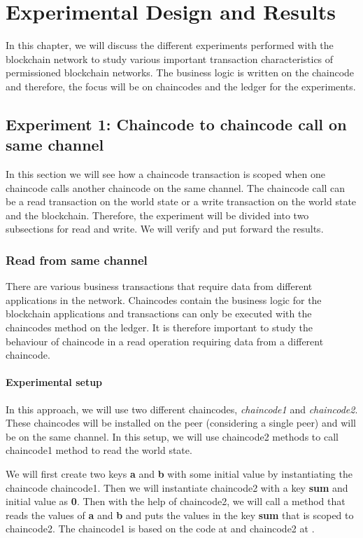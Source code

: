 \documentclass[
  a4paper,  %
  twoside,  %
  bibliography=totoc,
  headsepline,
  cleardoublepage=empty,
  parskip=half,
  draft=false
]{scrbook}
\begin{document}
\chapter{Experimental Design and Results}
In this chapter, we will discuss the different experiments performed with the blockchain network to study various important transaction characteristics of permissioned blockchain networks. The business logic is written on the chaincode and therefore, the focus will be on chaincodes and the ledger for the experiments. 
\label{chap:de}

\section{Experiment 1: Chaincode to chaincode call on same channel}
In this section we will see how a chaincode transaction is scoped when one chaincode calls another chaincode on the same channel. The chaincode call can be a read transaction on the world state or a write transaction on the world state and the blockchain. Therefore, the experiment will be divided into two subsections for read and write. We will verify and put forward the results.

\subsection{Read from same channel}
\label{sec:read}
There are various business transactions that require data from different applications in the network. Chaincodes contain the business logic for the blockchain applications and transactions can only be executed with the chaincodes method on the ledger. It is therefore important to study the behaviour of chaincode in a read operation requiring data from a different chaincode. 
\subsubsection{Experimental setup}
In this approach, we will use two different chaincodes, \textit{chaincode1} and \textit{chaincode2}. These chaincodes will be installed on the peer (considering a single peer) and will be on the same channel. In this setup, we will use chaincode2 methods to call chaincode1 method to read the world state. 

We will first create two keys \textbf{a} and \textbf{b} with some initial value by instantiating the chaincode chaincode1. Then we will instantiate chaincode2 with a key \textbf{sum} and initial value as \textbf{0}. Then with the help of chaincode2, we will call a method that reads the values of \textbf{a} and \textbf{b} and puts the values in the key \textbf{sum} that is scoped to chaincode2. The chaincode1 is based on the code at \cite{ce2} and chaincode2 at \cite{ce5}. 
\end{document}
